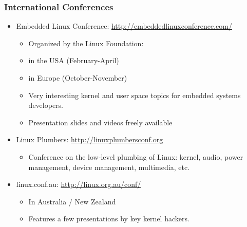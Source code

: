 \begin{frame}
  \frametitle{International Conferences}
  \begin{itemize}
  \item Embedded Linux Conference: \url{http://embeddedlinuxconference.com/}
    \begin{itemize}
    \item Organized by the Linux Foundation:
    \item in the USA (February-April)
    \item in Europe (October-November)
    \item Very interesting kernel and user space topics for embedded
      systems developers.
    \item Presentation slides and videos freely available
    \end{itemize}
  \item Linux Plumbers: \url{http://linuxplumbersconf.org}
    \begin{itemize}
    \item Conference on the low-level plumbing of Linux: kernel,
      audio, power management, device management, multimedia, etc.
    \end{itemize}
  \item linux.conf.au: \url{http://linux.org.au/conf/}
    \begin{itemize}
    \item In Australia / New Zealand
    \item Features a few presentations by key kernel hackers.
    \end{itemize}
  \end{itemize}
\end{frame}
